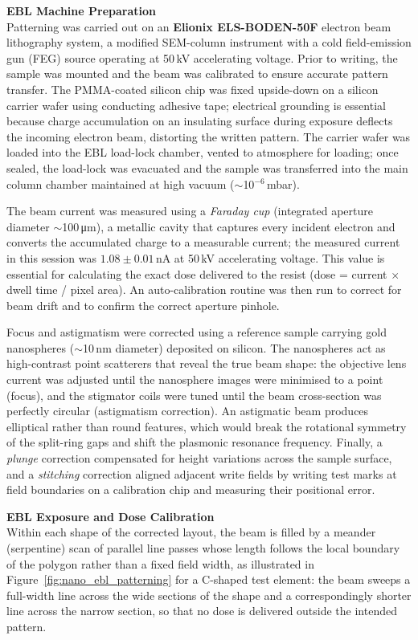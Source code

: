 \textbf{EBL Machine Preparation} \\
Patterning was carried out on an \textbf{Elionix ELS-BODEN-50F} \cite{ElionixELS50F} electron beam lithography system, a modified SEM-column instrument with a cold field-emission gun (FEG) source operating at 50\,kV accelerating voltage. Prior to writing, the sample was mounted and the beam was calibrated to ensure accurate pattern transfer. The PMMA-coated silicon chip was fixed upside-down on a silicon carrier wafer using conducting adhesive tape; electrical grounding is essential because charge accumulation on an insulating surface during exposure deflects the incoming electron beam, distorting the written pattern. The carrier wafer was loaded into the EBL load-lock chamber, vented to atmosphere for loading; once sealed, the load-lock was evacuated and the sample was transferred into the main column chamber maintained at high vacuum ($\sim$10$^{-6}$\,mbar).

The beam current was measured using a \textit{Faraday cup} (integrated aperture diameter $\sim$100\,\si{\micro\meter}), a metallic cavity that captures every incident electron and converts the accumulated charge to a measurable current; the measured current in this session was $1.08 \pm 0.01$\,nA at 50\,kV accelerating voltage. This value is essential for calculating the exact dose delivered to the resist (dose = current $\times$ dwell time / pixel area). An auto-calibration routine was then run to correct for beam drift and to confirm the correct aperture pinhole.

Focus and astigmatism were corrected using a reference sample carrying gold nanospheres ($\sim$10\,nm diameter) deposited on silicon. The nanospheres act as high-contrast point scatterers that reveal the true beam shape: the objective lens current was adjusted until the nanosphere images were minimised to a point (focus), and the stigmator coils were tuned until the beam cross-section was perfectly circular (astigmatism correction). An astigmatic beam produces elliptical rather than round features, which would break the rotational symmetry of the split-ring gaps and shift the plasmonic resonance frequency. Finally, a \textit{plunge} correction compensated for height variations across the sample surface, and a \textit{stitching} correction aligned adjacent write fields by writing test marks at field boundaries on a calibration chip and measuring their positional error.

\textbf{EBL Exposure and Dose Calibration} \\
Within each shape of the corrected layout, the beam is filled by a meander (serpentine) scan of
parallel line passes whose length follows the local boundary of the polygon rather than a fixed
field width, as illustrated in Figure~\ref{fig:nano_ebl_patterning} for a C-shaped test element:
the beam sweeps a full-width line across the wide sections of the shape and a correspondingly
shorter line across the narrow section, so that no dose is delivered outside the intended pattern.

